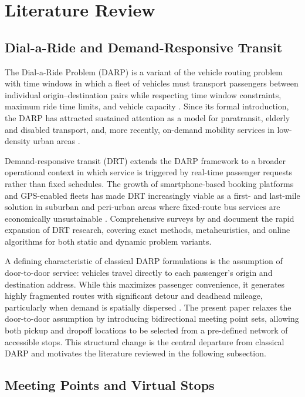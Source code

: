 \section{Literature Review}
\label{sec:literature}

\subsection{Dial-a-Ride and Demand-Responsive Transit}

The Dial-a-Ride Problem (DARP) is a variant of the vehicle routing problem with time windows in which a fleet of vehicles must transport passengers between individual origin--destination pairs while respecting time window constraints, maximum ride time limits, and vehicle capacity \citep{cordeau2007}. Since its formal introduction, the DARP has attracted sustained attention as a model for paratransit, elderly and disabled transport, and, more recently, on-demand mobility services in low-density urban areas \citep{psaraftis1988, parragh2008a}.

Demand-responsive transit (DRT) extends the DARP framework to a broader operational context in which service is triggered by real-time passenger requests rather than fixed schedules. The growth of smartphone-based booking platforms and GPS-enabled fleets has made DRT increasingly viable as a first- and last-mile solution in suburban and peri-urban areas where fixed-route bus services are economically unsustainable \citep{molenbruch2017}. Comprehensive surveys by \citet{ho2018} and \citet{pillac2013} document the rapid expansion of DRT research, covering exact methods, metaheuristics, and online algorithms for both static and dynamic problem variants.

A defining characteristic of classical DARP formulations is the assumption of door-to-door service: vehicles travel directly to each passenger's origin and destination address. While this maximizes passenger convenience, it generates highly fragmented routes with significant detour and deadhead mileage, particularly when demand is spatially dispersed \citep{agatz2012}. The present paper relaxes the door-to-door assumption by introducing bidirectional meeting point sets, allowing both pickup and dropoff locations to be selected from a pre-defined network of accessible stops. This structural change is the central departure from classical DARP and motivates the literature reviewed in the following subsection.

\subsection{Meeting Points and Virtual Stops}

